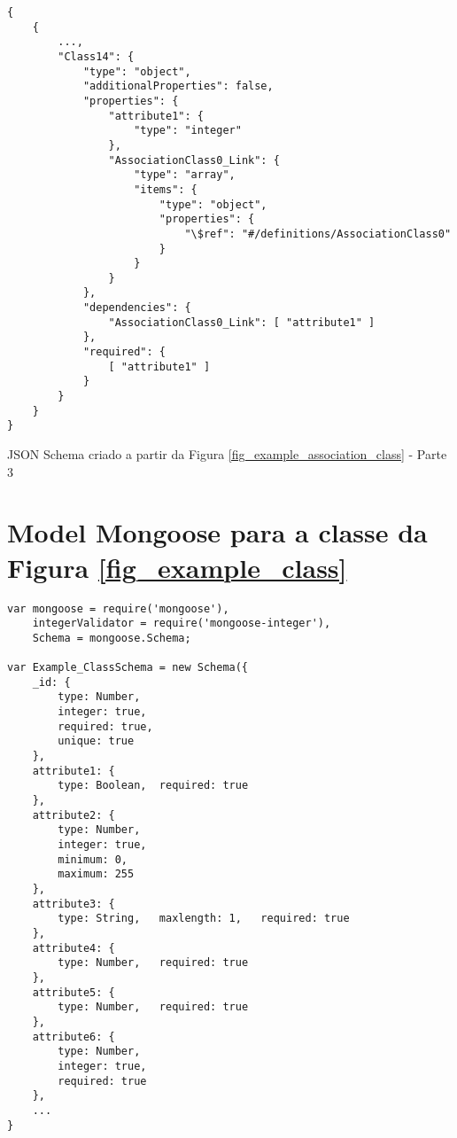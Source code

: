 \begin{anexosenv}
\begin{listing}
\begin{verbatim}
{
    {
        ...,
        "Class14": {
            "type": "object",
            "additionalProperties": false,
            "properties": {
                "attribute1": {
                    "type": "integer"
                },
                "AssociationClass0_Link": {
                    "type": "array",
                    "items": {
                        "type": "object",
                        "properties": {
                            "\$ref": "#/definitions/AssociationClass0"
                        }
                    }
                }
            },
            "dependencies": {
                "AssociationClass0_Link": [ "attribute1" ]
            },
            "required": {
                [ "attribute1" ]
            }
        }
    }
}
\end{verbatim}
\caption{JSON Schema criado a partir da Figura \ref{fig_example_association_class} - Parte 3}
\end{listing}


\chapter{Model Mongoose para a classe da Figura \ref{fig_example_class}}
\label{anexo:model_mongoose}

\begin{listing}

\begin{verbatim}
var mongoose = require('mongoose'),
    integerValidator = require('mongoose-integer'),
    Schema = mongoose.Schema;

var Example_ClassSchema = new Schema({
    _id: {
        type: Number,
        integer: true,
        required: true,
        unique: true
    },
    attribute1: {
        type: Boolean,  required: true
    },
    attribute2: {
        type: Number,
        integer: true,
        minimum: 0,
        maximum: 255
    },
    attribute3: {
        type: String,   maxlength: 1,   required: true
    },
    attribute4: {
        type: Number,   required: true
    },
    attribute5: {
        type: Number,   required: true
    },
    attribute6: {
        type: Number,
        integer: true,
        required: true
    },
    ...
}
\end{verbatim}
\end{listing}


\end{anexosenv}
